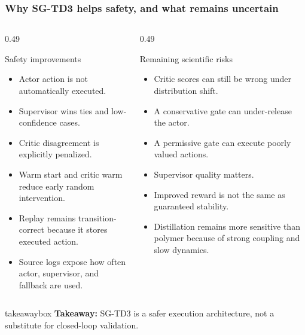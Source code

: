 \documentclass[aspectratio=169]{beamer}
\newcommand{\takeawaybox}[1]{%
\vspace{0.02cm}
\begin{center}
\begin{beamercolorbox}[wd=0.94\textwidth,sep=3pt,center,rounded=true,shadow=false]{takeawaybox}
\scriptsize
\textbf{\textcolor{maroon1}{Takeaway:}} #1
\end{beamercolorbox}
\end{center}
}
\begin{document}
\begin{frame}
\frametitle{\large \textbf{Why SG-TD3 helps safety, and what remains uncertain}}
\scriptsize

\begin{columns}[T,onlytextwidth]
\begin{column}{0.49\textwidth}
\begin{block}{Safety improvements}
\begin{itemize}\justifying
  \setlength\itemsep{0.45ex}
  \item Actor action is not automatically executed.
  \item Supervisor wins ties and low-confidence cases.
  \item Critic disagreement is explicitly penalized.
  \item Warm start and critic warm reduce early random intervention.
  \item Replay remains transition-correct because it stores executed action.
  \item Source logs expose how often actor, supervisor, and fallback are used.
\end{itemize}
\end{block}
\end{column}

\begin{column}{0.49\textwidth}
\begin{block}{Remaining scientific risks}
\begin{itemize}\justifying
  \setlength\itemsep{0.45ex}
  \item Critic scores can still be wrong under distribution shift.
  \item A conservative gate can under-release the actor.
  \item A permissive gate can execute poorly valued actions.
  \item Supervisor quality matters.
  \item Improved reward is not the same as guaranteed stability.
  \item Distillation remains more sensitive than polymer because of strong coupling and slow dynamics.
\end{itemize}
\end{block}
\end{column}
\end{columns}

\takeawaybox{SG-TD3 is a safer execution architecture, not a substitute for closed-loop validation.}
\end{frame}
\end{document}
